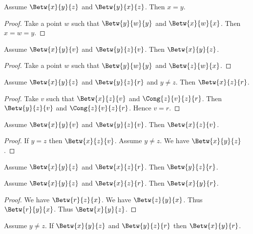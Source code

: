 \documentclass[10pt,a4paper,parskip=half,numbers=endperiod,parskip]{scrartcl}
\begin{document}
  \begin{forthel}
    \begin{lemma} %
      Assume $\Betw{x}{y}{z}$ and $\Betw{y}{x}{z}$.
      Then $x = y$.
    \end{lemma}
    \begin{proof}
      Take a point $w$ such that
      $\Betw{y}{w}{y}$ and $\Betw{x}{w}{x}$.
      Then $x = w = y$.
    \end{proof}

    \begin{lemma} %
      Assume $\Betw{x}{y}{v}$ and $\Betw{y}{z}{v}$.
      Then $\Betw{x}{y}{z}$.
    \end{lemma}
    \begin{proof}
      Take a point $w$ such that
      $\Betw{y}{w}{y}$ and $\Betw{z}{w}{x}$.
    \end{proof}

    \begin{lemma} %
      Assume $\Betw{x}{y}{z}$ and $\Betw{y}{z}{r}$ and $y \neq z$.
      Then $\Betw{x}{z}{r}$.
    \end{lemma}
    \begin{proof}
      Take $v$ such that $\Betw{x}{z}{v}$ and $\Cong{z}{v}{z}{r}$.
      Then $\Betw{y}{z}{v}$ and $\Cong{z}{v}{z}{r}$.
      Hence $v = r$.
    \end{proof}

    \begin{lemma} %
      Assume $\Betw{x}{y}{v}$ and $\Betw{y}{z}{v}$.
      Then $\Betw{x}{z}{v}$.
    \end{lemma}
    \begin{proof}
      If $y = z$ then $\Betw{x}{z}{v}$.
      Assume $y \neq z$.
      We have $\Betw{x}{y}{z}$.
    \end{proof}

    \begin{lemma} %
      Assume $\Betw{x}{y}{z}$ and $\Betw{x}{z}{r}$. Then $\Betw{y}{z}{r}$.
    \end{lemma}

    \begin{lemma} %
      Assume $\Betw{x}{y}{z}$ and $\Betw{x}{z}{r}$. Then $\Betw{x}{y}{r}$.
    \end{lemma}
    \begin{proof}
      We have $\Betw{r}{z}{x}$.
      We have $\Betw{z}{y}{x}$.
      Thus $\Betw{r}{y}{x}$. %
      Thus $\Betw{x}{y}{z}$.
    \end{proof}

    \begin{lemma} %
      Assume $y \neq z$.
      If $\Betw{x}{y}{z}$ and $\Betw{y}{z}{r}$
      then $\Betw{x}{y}{r}$.
    \end{lemma}
  \end{forthel}
\end{document}
